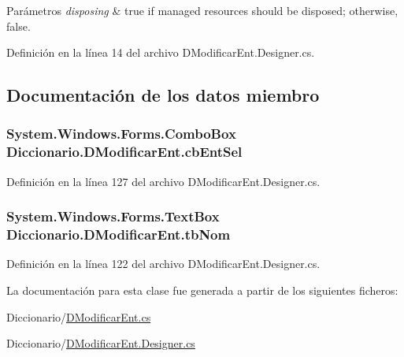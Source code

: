 \begin{DoxyParams}{Parámetros}
{\em disposing} & true if managed resources should be disposed; otherwise, false.\\
\hline
\end{DoxyParams}


Definición en la línea 14 del archivo D\-Modificar\-Ent.\-Designer.\-cs.



\subsection{Documentación de los datos miembro}
\hypertarget{class_diccionario_1_1_d_modificar_ent_ad5d89ad53a4c53b39d04e69fa3dcff49}{
\subsubsection[{cb\-Ent\-Sel}]{\setlength{\rightskip}{0pt plus 5cm}System.\-Windows.\-Forms.\-Combo\-Box Diccionario.\-D\-Modificar\-Ent.\-cb\-Ent\-Sel}}\label{class_diccionario_1_1_d_modificar_ent_ad5d89ad53a4c53b39d04e69fa3dcff49}


Definición en la línea 127 del archivo D\-Modificar\-Ent.\-Designer.\-cs.

\hypertarget{class_diccionario_1_1_d_modificar_ent_a293b61cfcd687ff24d2aa5eb5254f956}{
\subsubsection[{tb\-Nom}]{\setlength{\rightskip}{0pt plus 5cm}System.\-Windows.\-Forms.\-Text\-Box Diccionario.\-D\-Modificar\-Ent.\-tb\-Nom}}\label{class_diccionario_1_1_d_modificar_ent_a293b61cfcd687ff24d2aa5eb5254f956}


Definición en la línea 122 del archivo D\-Modificar\-Ent.\-Designer.\-cs.



La documentación para esta clase fue generada a partir de los siguientes ficheros\-:\begin{DoxyCompactItemize}
\item 
Diccionario/\hyperlink{_d_modificar_ent_8cs}{D\-Modificar\-Ent.\-cs}\item 
Diccionario/\hyperlink{_d_modificar_ent_8_designer_8cs}{D\-Modificar\-Ent.\-Designer.\-cs}\end{DoxyCompactItemize}
